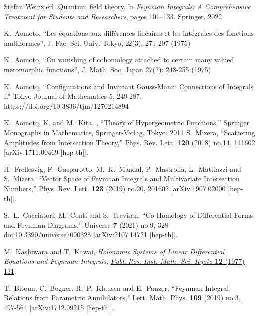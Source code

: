 \documentclass[a4paper,12pt]{article}
\numberwithin{equation}{section}
\numberwithin{figure}{section}
\begin{document}
\begin{thebibliography}{99}
Stefan Weinzierl.
\newblock Quantum field theory.
\newblock In {\em Feynman Integrals: A Comprehensive Treatment for Students and
  Researchers}, pages 101--133. Springer, 2022.
\newblock [arXiv:2201.03593] 
  


    K.~Aomoto, ``Les \'equations aux diff\'erences
     lin\'eaires et les int\'egrales des fonctions multiformes'',
     J. Fac. Sci. Univ. Tokyo, 22(3), 271-297  (1975)

   K.~Aomoto, ``On vanishing of cohomology attached to
    certain many valued meromorphic functions'', J. Math. Soc. Japan
    27(2): 248-255 (1975)

  
  K.~Aomoto, ``Configurations and Invariant Gauss-Manin Connections of Integrals I.'' Tokyo Journal of Mathematics 5, 249-287. https://doi.org/10.3836/tjm/1270214894

     K.~Aomoto, K. and M.~Kita, , ``Theory of Hypergeometric Functions,'' Springer Monographs in Mathematics, Springer-Verlag, Tokyo, 2011
S.~Mizera,
``Scattering Amplitudes from Intersection Theory,''
Phys. Rev. Lett. \textbf{120} (2018) no.14, 141602
[arXiv:1711.00469 [hep-th]].

H.~Frellesvig, F.~Gasparotto, M.~K.~Mandal, P.~Mastrolia, L.~Mattiazzi and S.~Mizera,
``Vector Space of Feynman Integrals and Multivariate Intersection Numbers,''
Phys. Rev. Lett. \textbf{123} (2019) no.20, 201602
[arXiv:1907.02000 [hep-th]].
    
S.~L.~Cacciatori, M.~Conti and S.~Trevisan,
``Co-Homology of Differential Forms and Feynman Diagrams,''
Universe \textbf{7} (2021) no.9, 328
doi:10.3390/universe7090328
[arXiv:2107.14721 [hep-th]].
  


M.~Kashiwara and T.~Kawai, \emph{{Holonomic Systems of Linear Differential
		Equations and Feynman Integrals}},
\href{https://doi.org/10.2977/prims/1195196602}{\emph{Publ. Res. Inst. Math.
		Sci. Kyoto} {\bfseries 12} (1977) 131}.

  
T.~Bitoun, C.~Bogner, R.~P.~Klausen and E.~Panzer,
``Feynman Integral Relations from Parametric Annihilators,''
Lett. Math. Phys. \textbf{109} (2019) no.3, 497-564
[arXiv:1712.09215 [hep-th]].


\end{thebibliography}
\end{document}
